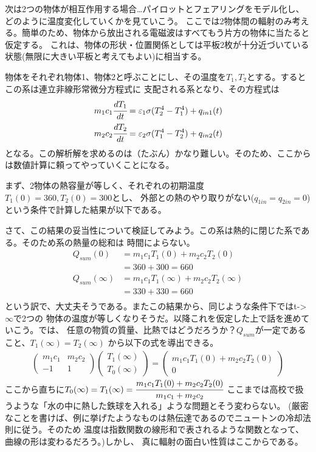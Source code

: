 \documentclass[C:\wrks\ODEof2ThermoRadiation\doc\ExaminationOfRadiationEff.tex]{subfiles}
\begin{document}
次は2つの物体が相互作用する場合…パイロットとフェアリングをモデル化し、どのように温度変化していくかを見ていこう。
ここでは2物体間の輻射のみ考える。簡単のため、物体から放出される電磁波はすべてもう片方の物体に当たると仮定する。
これは、物体の形状・位置関係としては平板2枚が十分近づいている状態(無限に大きい平板と考えてもよい)に相当する。\par
物体をそれぞれ物体1、物体2と呼ぶことにし、その温度を$T_{1}, T_{2}$とする。するとこの系は連立非線形常微分方程式に
支配される系となり、その方程式は
\begin{align*}
  m_{1}c_{1} \cfrac{dT_{1}}{dt} = \varepsilon_{1} \sigma \lparen T_{2}^{4} - T_{1}^{4} \rparen + q_{in1}(t)\\
  m_{2}c_{2} \cfrac{dT_{2}}{dt} = \varepsilon_{2} \sigma \lparen T_{1}^{4} - T_{2}^{4} \rparen + q_{in2}(t)\\
\end{align*}
となる。この解析解を求めるのは（たぶん）かなり難しい。そのため、ここからは数値計算に頼ってやっていくことになる。\par

まず、2物体の熱容量が等しく、それぞれの初期温度$T_{1} (0) = 360,T_{2} (0) = 300$とし、
外部との熱のやり取りがない($q_{1in} = q_{2in} = 0$)という条件で計算した結果が以下である。

さて、この結果の妥当性について検証してみよう。この系は熱的に閉じた系である。そのため系の熱量の総和は
時間によらない。
\begin{align*}
  Q_{sum}(0) &= m_{1} c_{1} T_{1}(0) + m_{2} c_{2} T_{2}(0)\\
  &=360 + 300 = 660\\
  Q_{sum}(\infty) &= m_{1} c_{1} T_{1}(\infty) + m_{2} c_{2} T_{2}(\infty)\\
  &=330 + 330 = 660\\
\end{align*}
という訳で、大丈夫そうである。またこの結果から、同じような条件下ではt->$\infty$で2つの
物体の温度が等しくなりそうだ。以降これを仮定した上で話を進めていこう。では、
任意の物質の質量、比熱ではどうだろうか？$Q_{sum}$が一定であること、$T_{1}(\infty) = T_{2}(\infty)$
から以下の式を導出できる。
\begin{align*}
  \begin{pmatrix}
    m_{1} c_{1}& m_{2} c_{2}\\
    -1&1
  \end{pmatrix}
  \begin{pmatrix}
    T_{1}(\infty)\\
    T_{0}(\infty)
  \end{pmatrix}
  =
  \begin{pmatrix}
    m_{1} c_{1} T_{1}(0) + m_{2} c_{2} T_{2}(0) \\
    0
  \end{pmatrix}
\end{align*}
ここから直ちに$T_{0}(\infty) = T_{1}(\infty) = \cfrac{m_{1} c_{1} T_{1}(0) + m_{2} c_{2} T_{2}(0)}{m_{1} c_{1} + m_{2} c_{2}}$
ここまでは高校で扱うような「水の中に熱した鉄球を入れる」ような問題とそう変わらない。
(厳密なことを書けば、例に挙げたようなものは熱伝達であるのでニュートンの冷却法則に従う。そのため
温度は指数関数の線形和で表されるような関数となって、曲線の形は変わるだろう。)しかし、
真に輻射の面白い性質はここからである。
\end{document}
